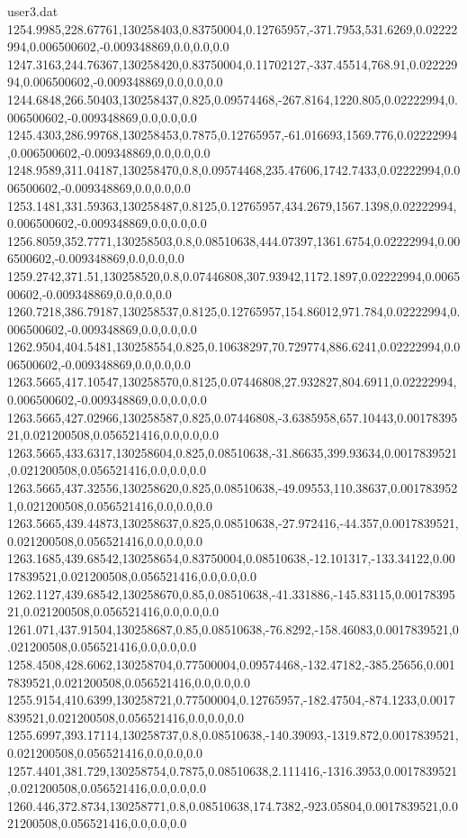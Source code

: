 \begin{filecontents}{user3.dat}
1254.9985,228.67761,130258403,0.83750004,0.12765957,-371.7953,531.6269,0.02222994,0.006500602,-0.009348869,0.0,0.0,0.0
1247.3163,244.76367,130258420,0.83750004,0.11702127,-337.45514,768.91,0.02222994,0.006500602,-0.009348869,0.0,0.0,0.0
1244.6848,266.50403,130258437,0.825,0.09574468,-267.8164,1220.805,0.02222994,0.006500602,-0.009348869,0.0,0.0,0.0
1245.4303,286.99768,130258453,0.7875,0.12765957,-61.016693,1569.776,0.02222994,0.006500602,-0.009348869,0.0,0.0,0.0
1248.9589,311.04187,130258470,0.8,0.09574468,235.47606,1742.7433,0.02222994,0.006500602,-0.009348869,0.0,0.0,0.0
1253.1481,331.59363,130258487,0.8125,0.12765957,434.2679,1567.1398,0.02222994,0.006500602,-0.009348869,0.0,0.0,0.0
1256.8059,352.7771,130258503,0.8,0.08510638,444.07397,1361.6754,0.02222994,0.006500602,-0.009348869,0.0,0.0,0.0
1259.2742,371.51,130258520,0.8,0.07446808,307.93942,1172.1897,0.02222994,0.006500602,-0.009348869,0.0,0.0,0.0
1260.7218,386.79187,130258537,0.8125,0.12765957,154.86012,971.784,0.02222994,0.006500602,-0.009348869,0.0,0.0,0.0
1262.9504,404.5481,130258554,0.825,0.10638297,70.729774,886.6241,0.02222994,0.006500602,-0.009348869,0.0,0.0,0.0
1263.5665,417.10547,130258570,0.8125,0.07446808,27.932827,804.6911,0.02222994,0.006500602,-0.009348869,0.0,0.0,0.0
1263.5665,427.02966,130258587,0.825,0.07446808,-3.6385958,657.10443,0.0017839521,0.021200508,0.056521416,0.0,0.0,0.0
1263.5665,433.6317,130258604,0.825,0.08510638,-31.86635,399.93634,0.0017839521,0.021200508,0.056521416,0.0,0.0,0.0
1263.5665,437.32556,130258620,0.825,0.08510638,-49.09553,110.38637,0.0017839521,0.021200508,0.056521416,0.0,0.0,0.0
1263.5665,439.44873,130258637,0.825,0.08510638,-27.972416,-44.357,0.0017839521,0.021200508,0.056521416,0.0,0.0,0.0
1263.1685,439.68542,130258654,0.83750004,0.08510638,-12.101317,-133.34122,0.0017839521,0.021200508,0.056521416,0.0,0.0,0.0
1262.1127,439.68542,130258670,0.85,0.08510638,-41.331886,-145.83115,0.0017839521,0.021200508,0.056521416,0.0,0.0,0.0
1261.071,437.91504,130258687,0.85,0.08510638,-76.8292,-158.46083,0.0017839521,0.021200508,0.056521416,0.0,0.0,0.0
1258.4508,428.6062,130258704,0.77500004,0.09574468,-132.47182,-385.25656,0.0017839521,0.021200508,0.056521416,0.0,0.0,0.0
1255.9154,410.6399,130258721,0.77500004,0.12765957,-182.47504,-874.1233,0.0017839521,0.021200508,0.056521416,0.0,0.0,0.0
1255.6997,393.17114,130258737,0.8,0.08510638,-140.39093,-1319.872,0.0017839521,0.021200508,0.056521416,0.0,0.0,0.0
1257.4401,381.729,130258754,0.7875,0.08510638,2.111416,-1316.3953,0.0017839521,0.021200508,0.056521416,0.0,0.0,0.0
1260.446,372.8734,130258771,0.8,0.08510638,174.7382,-923.05804,0.0017839521,0.021200508,0.056521416,0.0,0.0,0.0

\end{filecontents}
